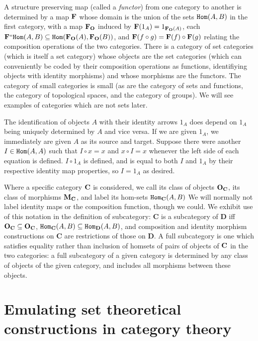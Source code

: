 \documentclass[12pt]{article}
\begin{document}
A structure preserving map (called a {\em functor}) from one category to another is determined by a map ${\bf F}$ whose domain is the union of the sets ${\tt Hom}(A,B)$ in the first category, with a map ${\bf F_O}$ induced by ${\bf F}(1_A) = 1_{{\bf F_O}(A)}$, each ${\bf F}``{\tt Hom}(A,B) \subseteq {\tt Hom}({\bf F_O}(A),{\bf F_O}(B))$, and
${\bf F}(f \circ g) = {\bf F}(f) \circ {\bf F}(g)$ relating the composition operations of the two categories.   There is a category of set categories (which is itself a set category) whose objects are the set categories (which can conveniently be coded by their composition operations as functions, identifiying objects with identity morphisms) and whose morphisms are the functors.   The category of small categories is small (as are the category of sets and functions, the category of topological spaces, and the category of groups).  We will see examples of categories which are not sets later.

The identification of objects $A$ with their identity arrows $1_A$ does depend on $1_A$ being uniquely determined by $A$ and vice versa.  If we are given $1_A$, we immediately are given $A$ as its source and target.  Suppose there were another $I \in {\tt Hom}(A,A)$ such that $I \circ x = x$ and $x \circ I = x$ whenever the left side of each equation is defined.
$I \circ 1_A$ is defined, and is equal to both $I$ and $1_A$ by their respective identity map properties, so $I=1_A$ as desired.

Where a specific category ${\bf C}$ is considered, we call its class of objects ${\bf O_C}$, its class of morphisms ${\bf M_C}$, and  label its hom-sets ${\tt Hom}_{\bf C}(A,B)$  We will normally not label identity maps or the composition function, though we could.  We exhibit use of this notation in the definition of subcategory:  {\bf C} is a subcategory of {\bf D} iff
${\bf O_C} \subseteq {\bf O_C}$, ${\tt Hom}_{\bf C}(A,B) \subseteq {\tt Hom}_{\bf D}(A,B)$, and composition and identity morphism constructions on {\bf C} are restrictions of  those on {\bf D}.  A full subcategory is one which satisfies equality rather than inclusion of homsets of pairs of objects of ${\bf C}$ in the two categories:  a full subcategory of a given category is determined
by any class of objects of the given category, and includes all morphisms between these objects.

\section{Emulating set theoretical constructions in category theory}
\end{document}
